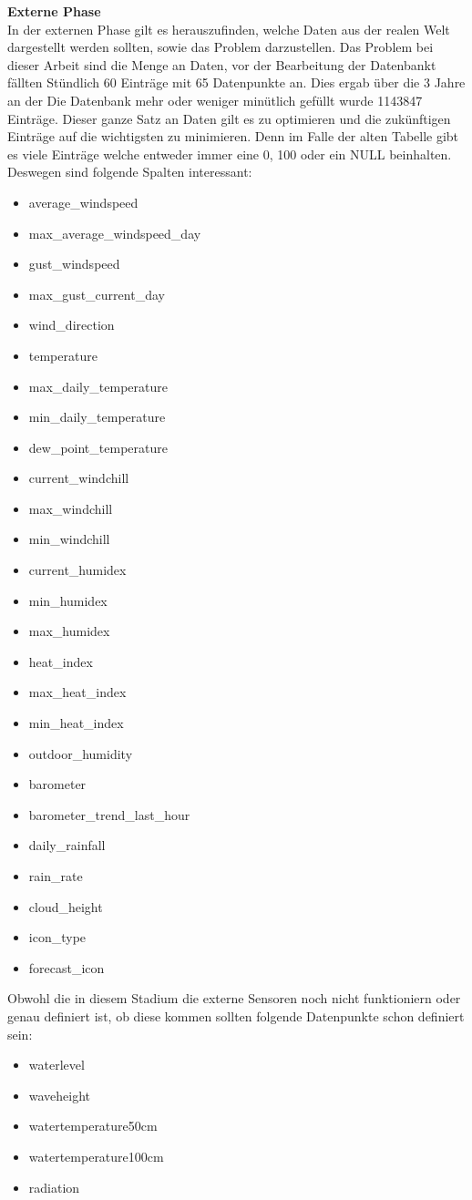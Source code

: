 \textbf{Externe Phase}\\
In der externen Phase gilt es herauszufinden, welche Daten aus der realen Welt dargestellt werden sollten, sowie das Problem darzustellen. Das Problem bei dieser Arbeit sind die Menge an Daten, vor der Bearbeitung der Datenbankt fällten Stündlich 60 Einträge mit 65 Datenpunkte an. Dies ergab über die 3 Jahre an der Die Datenbank mehr oder weniger minütlich gefüllt wurde 1143847 Einträge. Dieser ganze Satz an Daten gilt es zu optimieren und die zukünftigen Einträge auf die wichtigsten zu minimieren. Denn im Falle der alten Tabelle gibt es viele Einträge welche entweder immer eine 0, 100 oder ein NULL beinhalten. Deswegen sind folgende Spalten interessant: 
 \begin{itemize}
\item average_windspeed
\item max_average_windspeed_day 
\item gust_windspeed
\item  max_gust_current_day 
\item  wind_direction 
\item  temperature  
\item  max_daily_temperature 
\item  min_daily_temperature  
\item  dew_point_temperature 
\item  current_windchill  
\item  max_windchill 
\item  min_windchill
\item  current_humidex  
\item  min_humidex  
\item  max_humidex  
\item  heat_index 
\item  max_heat_index 
\item  min_heat_index 
\item  outdoor_humidity 
\item  barometer 
\item  barometer_trend_last_hour 
\item  daily_rainfall  
\item  rain_rate  
\item  cloud_height  
\item  icon_type  
\item  forecast_icon
\end{itemize}

Obwohl die in diesem Stadium die externe Sensoren noch nicht funktioniern oder genau definiert ist, ob diese kommen sollten folgende Datenpunkte schon definiert sein: 
\begin{itemize}
\item waterlevel
\item waveheight
\item watertemperature50cm 
\item watertemperature100cm 
\item radiation 
\end{itemize}

